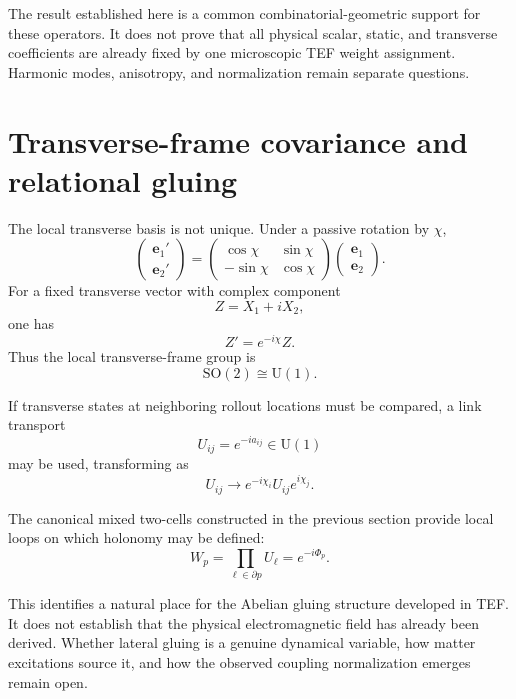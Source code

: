 \documentclass[11pt]{article}
\newcommand{\SO}{\mathrm{SO}}
\newcommand{\U}{\mathrm{U}}
\begin{document}
The result established here is a common combinatorial-geometric support for these operators. It does not prove that all physical scalar, static, and transverse coefficients are already fixed by one microscopic TEF weight assignment. Harmonic modes, anisotropy, and normalization remain separate questions.

\section{Transverse-frame covariance and relational gluing}

The local transverse basis is not unique. Under a passive rotation by \(\chi\),
\begin{equation}
\begin{pmatrix}
\mathbf e_1'\\
\mathbf e_2'
\end{pmatrix}
=
\begin{pmatrix}
\cos\chi&\sin\chi\\
-\sin\chi&\cos\chi
\end{pmatrix}
\begin{pmatrix}
\mathbf e_1\\
\mathbf e_2
\end{pmatrix}.
\end{equation}
For a fixed transverse vector with complex component
\[
Z=X_1+iX_2,
\]
one has
\[
Z'=e^{-i\chi}Z.
\]
Thus the local transverse-frame group is
\begin{equation}
\boxed{\SO(2)\cong\U(1).}
\end{equation}

If transverse states at neighboring rollout locations must be compared, a link transport
\begin{equation}
U_{ij}=e^{-ia_{ij}}\in\U(1)
\end{equation}
may be used, transforming as
\begin{equation}
U_{ij}\rightarrow e^{-i\chi_i}U_{ij}e^{i\chi_j}.
\end{equation}

The canonical mixed two-cells constructed in the previous section provide local loops on which holonomy may be defined:
\begin{equation}
W_p
=
\prod_{\ell\in\partial p}U_\ell
=
e^{-i\Phi_p}.
\end{equation}

This identifies a natural place for the Abelian gluing structure developed in TEF. It does not establish that the physical electromagnetic field has already been derived. Whether lateral gluing is a genuine dynamical variable, how matter excitations source it, and how the observed coupling normalization emerges remain open.
\end{document}
